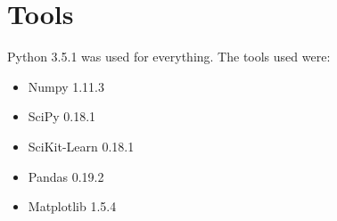\section{Tools}

Python 3.5.1 was used for everything. The tools used were:

\begin{itemize}
    \item Numpy 1.11.3~\cite{web_numpy}
    \item SciPy 0.18.1~\cite{web_scipy}
    \item SciKit-Learn 0.18.1~\cite{web_scikit}
    \item Pandas 0.19.2~\cite{web_pandas}
    \item Matplotlib 1.5.4~\cite{web_matplotlib}
\end{itemize}
